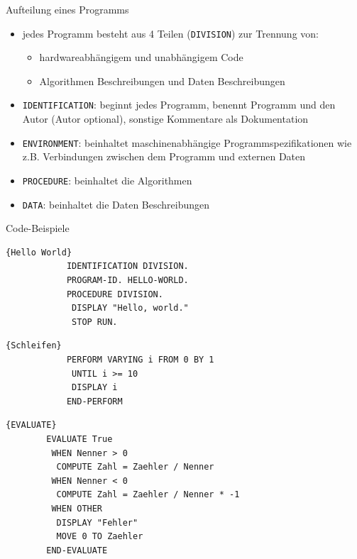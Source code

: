 \documentclass[handout]{beamer}
\begin{document}
\begin{frame}{Aufteilung eines Programms}
	\begin{itemize}[<+->]
		\item
			jedes Programm besteht aus 4 Teilen (\texttt{DIVISION}) zur Trennung von:
			\begin{itemize}[<+->]
			 	\item hardwareabh\"angigem und unabh\"angigem Code
				\item Algorithmen Beschreibungen und Daten Beschreibungen
			 \end{itemize}
		\item
			\texttt{IDENTIFICATION}: beginnt jedes Programm, benennt Programm und den Autor (Autor optional), sonstige Kommentare als Dokumentation
		\item
			\texttt{ENVIRONMENT}: beinhaltet maschinenabhängige Programmspezifikationen wie z.B. Verbindungen zwischen dem Programm und externen Daten
		\item
			\texttt{PROCEDURE}: beinhaltet die Algorithmen
		\item
			\texttt{DATA}: beinhaltet die Daten Beschreibungen
	\end{itemize}
\end{frame}

\def\beamertemplatetransparentcoveredmedium{}
\beamertemplatetransparentcoveredmedium %
\begin{frame}[fragile]{Code-Beispiele}
	\onslide<1-1>%
	\noindent\begin{minipage}{.44\textwidth}
		\begin{lstlisting}{Hello World}
			IDENTIFICATION DIVISION.
			PROGRAM-ID. HELLO-WORLD.
			PROCEDURE DIVISION.
			 DISPLAY "Hello, world."
			 STOP RUN.
		\end{lstlisting}
	\end{minipage}\hfill\pause
	\noindent\begin{minipage}{.53\textwidth}
		\begin{lstlisting}{Schleifen}
			PERFORM VARYING i FROM 0 BY 1
			 UNTIL i >= 10
			 DISPLAY i
			END-PERFORM
		\end{lstlisting}
	\end{minipage}\pause
	\lstset{numbers=left,firstnumber=1}
	\begin{lstlisting}{EVALUATE}
		EVALUATE True
		 WHEN Nenner > 0
		  COMPUTE Zahl = Zaehler / Nenner
		 WHEN Nenner < 0
		  COMPUTE Zahl = Zaehler / Nenner * -1
		 WHEN OTHER
		  DISPLAY "Fehler"
		  MOVE 0 TO Zaehler
		END-EVALUATE
	\end{lstlisting}
\end{frame}
\end{document}
